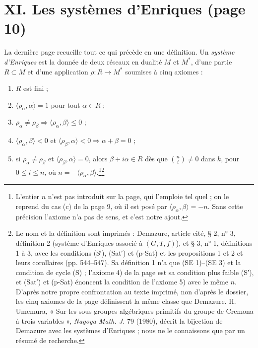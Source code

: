 \documentclass[11pt,a4paper]{article}
\begin{document}
\section*{XI. Les systèmes d'Enriques (page 10)}

La dernière page recueille tout ce qui précède en une définition. Un
\emph{système d'Enriques} est la donnée de deux réseaux en dualité $M$ et
$M^*$, d'une partie $R \subset M$ et d'une application $\rho : R \to M^*$
soumises à cinq axiomes :

\begin{enumerate}
  \item[1)] $R$ est fini ;
  \item[2)] $\langle \rho_\alpha, \alpha \rangle = 1$ pour tout $\alpha \in R$ ;
  \item[3)] $\rho_\alpha \neq \rho_\beta \Longrightarrow \langle \rho_\alpha,
    \beta \rangle \leq 0$ ;
  \item[4)] $\langle \rho_\alpha, \beta \rangle < 0$ et $\langle \rho_\beta,
    \alpha \rangle < 0 \Longrightarrow \alpha + \beta = 0$ ;
  \item[5)] si $\rho_\alpha \neq \rho_\beta$ et $\langle \rho_\beta, \alpha
    \rangle = 0$, alors $\beta + i\alpha \in R$ dès que $\binom{n}{i} \neq 0$
    dans $k$, pour $0 \leq i \leq n$, où $n = -\langle \rho_\alpha, \beta
    \rangle$.\footnote{L'entier $n$ n'est pas introduit sur la page, qui
    l'emploie tel quel ; on le reprend du cas (c) de la page 9, où il est posé
    par $\langle \rho_\alpha, \beta \rangle = -n$. Sans cette précision l'axiome
    n'a pas de sens, et c'est notre ajout.}\footnote{Le nom et la définition
sont imprimés : Demazure, article cité, § 2, n° 3, définition 2 (système
d'Enriques associé à $(G, T, f)$), et § 3, n° 1, définitions 1 à 3, avec les
conditions (S′), (Sat′) et (p-Sat) et les propositions 1 et 2 et leurs
corollaires (pp. 544--547). Sa définition 1 n'a que (SE 1)--(SE 3) et la
condition de cycle (S) ; l'axiome 4) de la page est sa condition plus faible
(S′), et (Sat′) et (p-Sat) énoncent la condition de l'axiome 5) avec le
même $n$. D'après notre propre
confrontation au texte imprimé, non d'après le dossier, les cinq axiomes de la
page définissent la même classe que Demazure. H. Umemura, « Sur les
sous-groupes algébriques primitifs du groupe de Cremona à trois variables »,
\emph{Nagoya Math. J.} 79 (1980), décrit la bijection de Demazure avec les
systèmes d'Enriques ; nous ne le connaissons que par un résumé de recherche.}
\end{enumerate}
\end{document}
